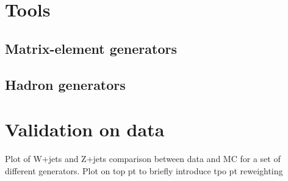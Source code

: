 \section{Tools}
\label{sec:tools}

\subsection{Matrix-element generators}
\label{sec:ME}

\subsection{Hadron generators}
\label{sec:Had}

\section{Validation on data}
\label{sec:val}

\begin{TOINCLUDE}Plot of W+jets and Z+jets comparison between data and MC for a set of different generators. Plot on top pt to briefly introduce tpo pt reweighting\end{TOINCLUDE}